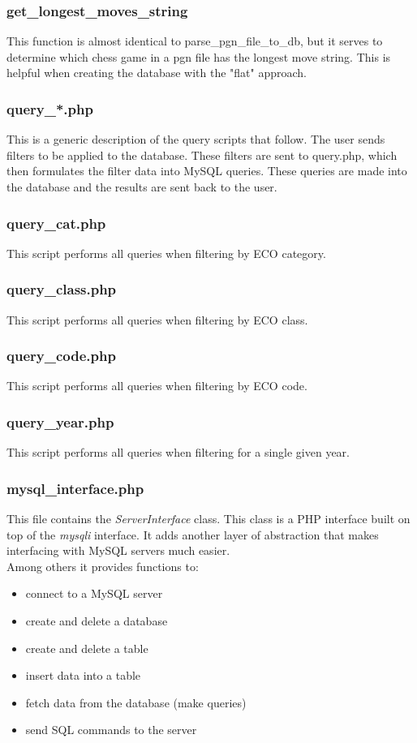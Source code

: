 \documentclass{article}
\begin{document}
\subsubsection*{get\_longest\_moves\_string}
This function is almost identical to parse\_pgn\_file\_to\_db, but it serves to determine which chess game in a pgn file has the longest move string.  This is helpful when creating the database with the "flat" approach.


\subsubsection{query\_*.php}
This is a generic description of the query scripts that follow. The user sends filters to be applied to the database.  These filters are sent to query.php, which then formulates the filter data into MySQL queries.  These queries are made into the database and the results are sent back to the user. 


\subsubsection{query\_cat.php}
This script performs all queries when filtering by ECO category.


\subsubsection{query\_class.php}
This script performs all queries when filtering by ECO class.


\subsubsection{query\_code.php}
This script performs all queries when filtering by ECO code.


\subsubsection{query\_year.php}
This script performs all queries when filtering for a single given year.


\subsubsection{mysql\_interface.php}
This file contains the \textit{ServerInterface} class. This class is a PHP interface built on top of the \textit{mysqli} interface. It adds another layer of abstraction that makes interfacing with MySQL servers much easier.
\\Among others it provides functions to:
\begin{itemize}
	\item connect to a MySQL server
	\item create and delete a database
	\item create and delete a table
	\item insert data into a table
	\item fetch data from the database (make queries)
	\item send SQL commands to the server
\end{itemize}
\end{document}
